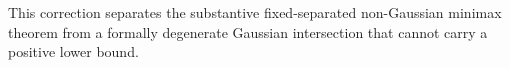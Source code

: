 This correction separates the substantive fixed-separated non-Gaussian minimax theorem from a formally degenerate Gaussian intersection that cannot carry a positive lower bound.